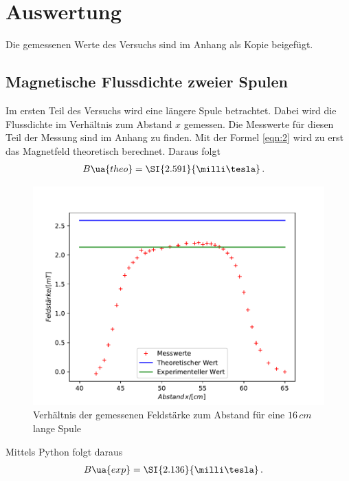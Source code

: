 
\section{Auswertung}
Die gemessenen Werte des Versuchs sind im Anhang als Kopie beigefügt.
\subsection{Magnetische Flussdichte zweier Spulen}
Im ersten Teil des Versuchs wird eine längere Spule betrachtet. Dabei wird die Flussdichte
im Verhältnis zum Abstand $x$ gemessen. Die Messwerte für diesen Teil der Messung sind im
Anhang zu finden. Mit der Formel \ref{eqn:2} wird zu erst das Magnetfeld theoretisch berechnet.
Daraus folgt
\begin{align}
B\ua{theo} &= \SI{2.591}{\milli\tesla}\,.
\end{align}
\begin{figure}
  \centering
  \includegraphics[width = 12 cm]{Spulelang.pdf}
  \caption{Verhältnis der gemessenen Feldstärke zum Abstand für eine $16\, cm$ lange Spule}
  \label{fig:Messunga}
\end{figure}
Mittels Python folgt daraus
\begin{align}
B\ua{exp} &= \SI{2.136}{\milli\tesla}\,.
\end{align}
\newpage

